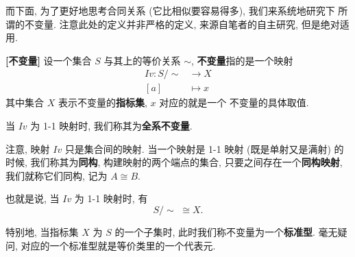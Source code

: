 \documentclass[UTF8]{book}
\begin{document}
而下面, 为了更好地思考合同关系 (它比相似要容易得多), 我们来系统地研究下
所谓的不变量. 注意此处的定义并非严格的定义, 来源自笔者的自主研究, 
但是绝对适用. 

\begin{definition}
    \textbf{[不变量]} 
    设一个集合 $S$ 与其上的等价关系 $\sim$, 
    \textbf{不变量}指的是一个映射 
    $$
    \begin{aligned}
        Iv: 
        S/\sim &\to X \\
        [a]  &\mapsto x
    \end{aligned}  
    $$
    其中集合 $X$ 表示不变量的\textbf{指标集}, $x$ 对应的就是一个
    不变量的具体取值. 

    当 $Iv$ 为 1-1 映射时, 我们称其为\textbf{全系不变量}. 

    注意, 映射 $Iv$ 只是集合间的映射.
    当一个映射是 1-1 映射 (既是单射又是满射) 的时候, 
    我们称其为\textbf{同构}, 构建映射的两个端点的集合, 
    只要之间存在一个\textbf{同构映射}, 我们就称它们同构, 
    记为 $A\cong B$. 

    也就是说, 当 $Iv$ 为 1-1 映射时, 有 
    $$ S/\sim \,\, \cong X. $$

    特别地, 当指标集 $X$ 为 $S$ 的一个子集时, 
    此时我们称不变量为一个\textbf{标准型}. 
    毫无疑问, 对应的一个标准型就是等价类里的一个代表元. 
\end{definition}
\end{document}
